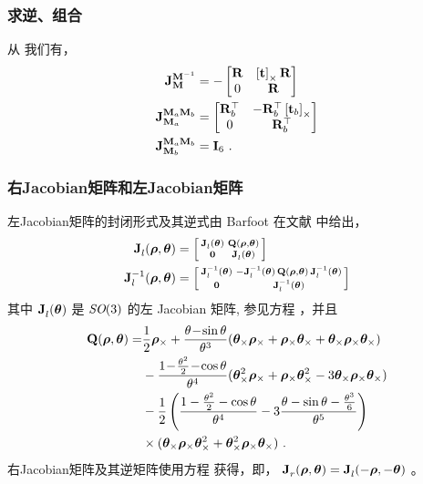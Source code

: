 \subsubsection{求逆、组合}

从  我们有，
%
\begin{align}
{{\bf J}^{{\bf M}^{-1}}_{{\bf M}}} &= - \begin{bmatrix}
  {\bf R} & \left[{\bf t}\right]_\times{\bf R} \\ 0 & {\bf R}
  \end{bmatrix} \\
{{\bf J}^{{\bf M}_a{\bf M}_b}_{{\bf M}_a}} &=   \begin{bmatrix}
  {\bf R}_b^{\top} & -{\bf R}_b^{\top}\left[{\bf t}_b\right]_\times \\ 0 & {\bf R}_b^{\top}
  \end{bmatrix} \\
{{\bf J}^{{\bf M}_a{\bf M}_b}_{{\bf M}_b}} &= {\bf I}_6  
~.
\end{align}

\subsubsection{右Jacobian矩阵和左Jacobian矩阵}

左Jacobian矩阵的封闭形式及其逆式由 Barfoot 在文献 \cite{BARFOOT-14} 中给出，
%
\begin{subequations}
\begin{align}
{{\bf J}^{}_{l}}({\bm \rho},{{\bm \theta}}) &= \begin{bsmallmatrix}
{{\bf J}^{}_{l}}({{\bm \theta}}) & {\bf Q}({\bm \rho},{{\bm \theta}}) \\
\bf0 & {{\bf J}^{}_{l}}({{\bm \theta}})
\end{bsmallmatrix}
\\
{{\bf J}^{-1}_{l}}({\bm \rho},{{\bm \theta}}) &= \begin{bsmallmatrix}
{{\bf J}^{-1}_{l}}({{\bm \theta}}) & -{{\bf J}^{-1}_{l}}({{\bm \theta}})\,{\bf Q}({\bm \rho},{{\bm \theta}})\,{{\bf J}^{-1}_{l}}({{\bm \theta}}) \\
\bf0 & {{\bf J}^{-1}_{l}}({{\bm \theta}})
\end{bsmallmatrix}
\end{align}
\end{subequations}
%
其中 ${{\bf J}^{}_{l}}({{\bm \theta}})$ 是 $\textit{SO}(3)$ 的左 Jacobian 矩阵, 参见方程  ，并且
%
\newcommand{\rhox}{\bfrho_\times}
\newcommand{\bthx}{\bth_\times}
%
\begin{align}
\bfQ(\bfrho,\bth) =& 
  \frac12\rhox 
  + \frac{\theta\!-\!\sin\theta}{\theta^3}(\bthx\rhox+\rhox\bthx+\bthx\rhox\bthx) 
  \notag\\
  &- \frac{1\! - \!\frac{\theta^2}{2}\! -\! \cos\theta}{\theta^4}(\bthx^2\rhox+\rhox\bthx^2-3\bthx\rhox\bthx)
  \notag\\
  &-\frac12\left(\frac{1 -  \frac{\theta^2}{2} - \cos\theta}{\theta^4} 
                  - 3\frac{\theta-\sin\theta-\frac{\theta^3}{6}}{\theta^5}\right)
  \notag\\
  &\times (\bthx\rhox\bthx^2 + \bthx^2\rhox\bthx)
~.
\end{align}
%
右Jacobian矩阵及其逆矩阵使用方程  获得，即， ${{\bf J}^{}_{r}}({\bm \rho},{{\bm \theta}})={{\bf J}^{}_{l}}(-{\bm \rho},-{{\bm \theta}})$ 。

